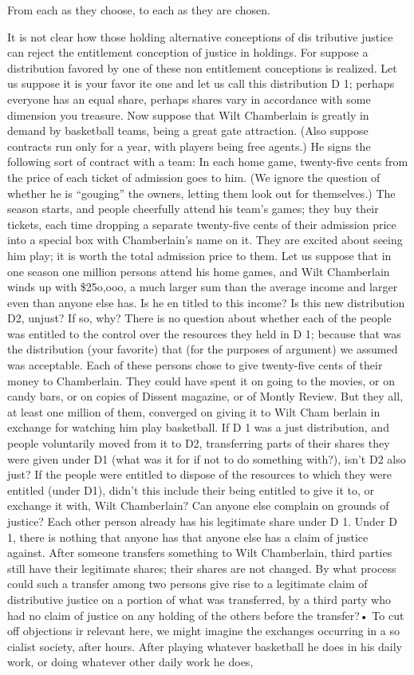 \documentclass[11pt,openany]{book}
\begin{document}
From each as they choose, to each as they are chosen. 

It is not clear how those holding alternative conceptions of dis tributive justice can reject the entitlement conception of justice in holdings. For suppose a distribution favored by one of these non entitlement conceptions is realized. Let us suppose it is your favor ite one and let us call this distribution D 1; perhaps everyone has an equal share, perhaps shares vary in accordance with some dimension you treasure. Now suppose that Wilt Chamberlain is greatly in demand by basketball teams, being a great gate attraction. (Also suppose contracts run only for a year, with players being free agents.) He signs the following sort of contract with a team: In each home game, twenty-five cents from the price of each ticket of admission goes to him. (We ignore the question of whether he is ``gouging'' the owners, letting them look out for themselves.) The season starts, and people cheerfully attend his team's games; they buy their tickets, each time dropping a separate twenty-five cents of their admission price into a special box with Chamberlain's name on it. They are excited about seeing him play; it is worth the total admission price to them. Let us suppose that in one season one million persons attend his home games, and Wilt Chamberlain winds up with \$25o,ooo, a much larger sum than the average income and larger even than anyone else has. Is he en titled to this income? Is this new distribution D2, unjust? If so, why? There is no question about whether each of the people was entitled to the control over the resources they held in D 1; because that was the distribution (your favorite) that (for the purposes of argument) we assumed was acceptable. Each of these persons chose to give twenty-five cents of their money to Chamberlain. They could have spent it on going to the movies, or on candy bars, or on copies of Dissent magazine, or of Montly Review. But they all, at least one million of them, converged on giving it to Wilt Cham berlain in exchange for watching him play basketball. If D 1 was a just distribution, and people voluntarily moved from it to D2, transferring parts of their shares they were given under D1 (what was it for if not to do something with?), isn't D2 also just? If the people were entitled to dispose of the resources to which they were entitled (under D1), didn't this include their being entitled to give it to, or exchange it with, Wilt Chamberlain? Can anyone else complain on grounds of justice? Each other person already has his legitimate share under D 1. Under D 1, there is nothing that anyone has that anyone else has a claim of justice against. After someone transfers something to Wilt Chamberlain, third parties still have their legitimate shares; their shares are not changed. By what process could such a transfer among two persons give rise to a legitimate claim of distributive justice on a portion of what was transferred, by a third party who had no claim of justice on any holding of the others before the transfer?• To cut off objections ir relevant here, we might imagine the exchanges occurring in a so cialist society, after hours. After playing whatever basketball he does in his daily work, or doing whatever other daily work he does, 
\end{document}
